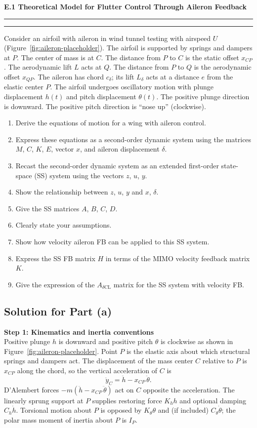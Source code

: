 \documentclass[12pt]{article}
\newcommand{\question}[1]{%
  \clearpage
  \vspace{0.5cm}
  {\noindent\normalsize \textbf{#1}}%
  \vspace{0.2cm}
  \hrule
  \vspace{0.1cm}
  \hrule
  \vspace{0.3cm}
}
\begin{document}
\question{E.1 Theoretical Model for Flutter Control Through Aileron Feedback}\label{quest:E1}

Consider an airfoil with aileron in wind tunnel testing with airspeed $U$ (Figure~\ref{fig:aileron-placeholder}). The airfoil is supported by springs and dampers at $P$. The center of mass is at $C$. The distance from $P$ to $C$ is the static offset $x_{CP}$. The aerodynamic lift $L$ acts at $Q$. The distance from $P$ to $Q$ is the aerodynamic offset $x_{QP}$. The aileron has chord $c_\delta$; its lift $L_\delta$ acts at a distance $e$ from the elastic center $P$. The airfoil undergoes oscillatory motion with plunge displacement $h(t)$ and pitch displacement $\theta(t)$. The positive plunge direction is downward. The positive pitch direction is ``nose up'' (clockwise).
\begin{enumerate}[label=(\alph*)]
  \item Derive the equations of motion for a wing with aileron control.
  \item Express these equations as a second-order dynamic system using the matrices $M$, $C$, $K$, $E$, vector $x$, and aileron displacement $\delta$.
  \item Recast the second-order dynamic system as an extended first-order state-space (SS) system using the vectors $z$, $u$, $y$.
  \item Show the relationship between $z$, $u$, $y$ and $x$, $\delta$.
  \item Give the SS matrices $A$, $B$, $C$, $D$.
  \item Clearly state your assumptions.
  \item Show how velocity aileron FB can be applied to this SS system.
  \item Express the SS FB matrix $H$ in terms of the MIMO velocity feedback matrix $K$.
  \item Give the expression of the $A_{\delta\text{CL}}$ matrix for the SS system with velocity FB.
\end{enumerate}
\subsection*{Solution for Part (a)}

\begin{stepbox}
\textbf{Step 1: Kinematics and inertia conventions}\\[0.5em]
Positive plunge $h$ is downward and positive pitch $\theta$ is clockwise as shown in Figure~\ref{fig:aileron-placeholder}. Point $P$ is the elastic axis about which structural springs and dampers act. The displacement of the mass center $C$ relative to $P$ is $x_{CP}$ along the chord, so the vertical acceleration of $C$ is
\[
  \ddot y_C = \ddot h - x_{CP}\,\ddot\theta.
\]
D'Alembert forces $-m(\ddot h - x_{CP}\,\ddot\theta)$ act on $C$ opposite the acceleration. The linearly sprung support at $P$ supplies restoring force $K_h h$ and optional damping $C_h \dot h$. Torsional motion about $P$ is opposed by $K_\theta \theta$ and (if included) $C_\theta \dot\theta$; the polar mass moment of inertia about $P$ is $I_P$.
\end{stepbox}
\end{document}
